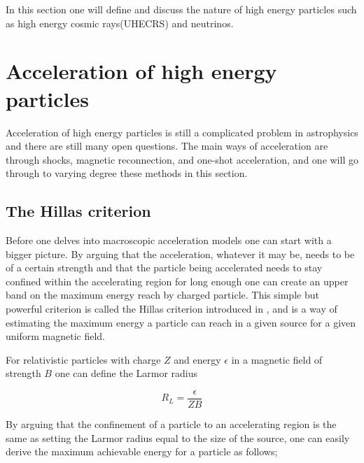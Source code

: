 \label{sec:high_energy_particles}


In this section one will define and discuss the nature of high energy particles such as high energy cosmic rays(UHECRS) and neutrinos. 

\section{Acceleration of high energy particles}

Acceleration of high energy particles is still a complicated problem in astrophysics and there are still many open questions. The main ways of acceleration are through shocks, magnetic reconnection, and one-shot acceleration, and one will go through to varying degree these methods in this section. 

\subsection{The Hillas criterion}


Before one delves into macroscopic acceleration models one can start with a bigger picture. By arguing that the acceleration, whatever it may be, needs to be of a certain strength and that the particle being accelerated needs to stay confined within the accelerating region for long enough one can create an upper band on the maximum energy reach by charged particle.
This simple but powerful criterion is called the Hillas criterion introduced in \cite{Hillas_1984}, and is a way of estimating the maximum energy a particle can reach in a given source for a given uniform magnetic field.%

For relativistic particles with charge $Z$ and energy $\epsilon$ in a magnetic field of strength $B$ one can define the Larmor radius


\begin{equation}
    R_L = \frac{\epsilon}{ZB}
\end{equation}

By arguing that the confinement of a particle to an accelerating region is the same as setting the Larmor radius equal to the size of the source, one can 
easily derive the maximum achievable energy for a particle as follows;%

